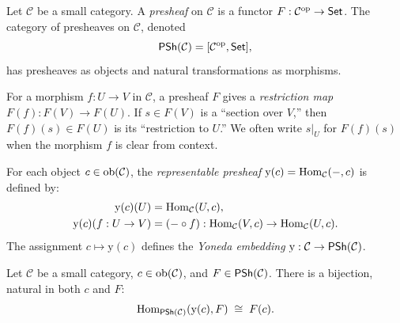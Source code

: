 \begin{definition}[Presheaf]
\label{def:presheaf}
Let $\mathcal{C}$ be a small category.  A \emph{presheaf} on
$\mathcal{C}$ is a functor $F : \mathcal{C}^{\mathrm{op}} \to \mathsf{Set}$.  The
category of presheaves on $\mathcal{C}$, denoted
\[
  \mathsf{PSh}(\mathcal{C}) = [\mathcal{C}^{\mathrm{op}}, \mathsf{Set}],
\]
has presheaves as objects and natural transformations as morphisms.
\end{definition}

For a morphism $f : U \to V$ in $\mathcal{C}$, a presheaf $F$ gives a
\emph{restriction map} $F(f) : F(V) \to F(U)$.  If $s \in F(V)$ is a
``section over $V$,'' then $F(f)(s) \in F(U)$ is its ``restriction to
$U$.''  We often write $s|_U$ for $F(f)(s)$ when the morphism $f$ is
clear from context.

\begin{definition}
\label{def:yoneda-embedding}
For each object $c \in \mathrm{ob}(\mathcal{C})$, the \emph{representable
presheaf} $\mathrm{y}(c) = \mathrm{Hom}_{\mathcal{C}}(-, c)$ is defined by:
\begin{align*}
  \mathrm{y}(c)(U) &= \mathrm{Hom}_{\mathcal{C}}(U, c), \\
  \mathrm{y}(c)(f : U \to V) &= (- \circ f) :
    \mathrm{Hom}_{\mathcal{C}}(V, c) \to \mathrm{Hom}_{\mathcal{C}}(U, c).
\end{align*}
The assignment $c \mapsto \mathrm{y}(c)$ defines the \emph{Yoneda
embedding} $\mathrm{y} : \mathcal{C} \to \mathsf{PSh}(\mathcal{C})$.
\end{definition}

\begin{theorem}
\label{thm:yoneda}
Let $\mathcal{C}$ be a small category, $c \in \mathrm{ob}(\mathcal{C})$, and
$F \in \mathsf{PSh}(\mathcal{C})$.  There is a bijection, natural in both $c$
and $F$:
\[
  \mathrm{Hom}_{\mathsf{PSh}(\mathcal{C})}(\mathrm{y}(c), F) \;\cong\; F(c).
\]
\end{theorem}

